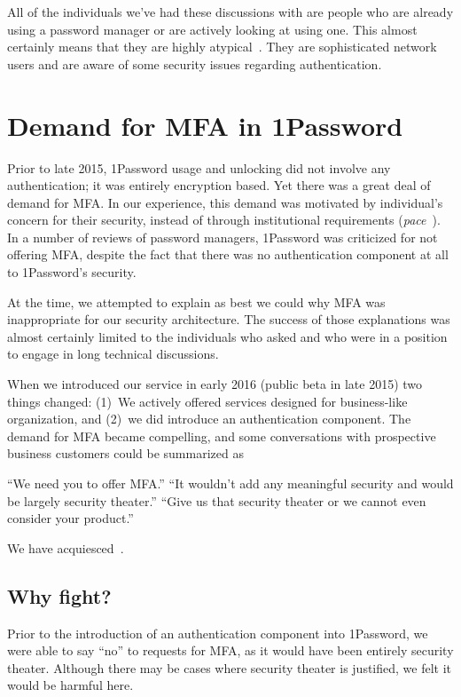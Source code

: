 \documentclass[12pt]{article}
\begin{document}
All of the individuals we've had these discussions with are people who are already using a password manager or are actively looking at using one.
This almost certainly means that they are highly atypical~\autocite{Stobert2014:agony}. 
They are sophisticated network users and are aware of some security issues regarding authentication.

\section{Demand for MFA in 1Password}\label{sec:demand}

Prior to late 2015, 1Password usage and unlocking did not involve any
authentication; it was entirely encryption based.
Yet there was a great deal of demand for MFA\@.
In our experience, this demand was motivated by individual's concern for their security,
instead of through institutional requirements (\textit{pace}~\autocite{CristofaroDFN13}).
In a number of reviews of password managers, 1Password was criticized for not offering MFA, despite the fact that there was no authentication component at all to 1Password's security.

At the time, we attempted to explain as best we could why MFA was inappropriate for our security architecture. The success of those explanations was almost certainly limited to the individuals who asked and who were in a position to engage in long technical discussions.

When we introduced our service in early 2016 (public beta in late 2015) two things changed:
(1)~We actively offered services designed for business-like organization, and (2)~we did introduce an authentication component.
The demand for MFA became compelling,
and some conversations with prospective business customers could be summarized as 

“We need you to offer MFA\@.”\newline
“It wouldn't add any meaningful security and would be largely security theater.”\newline
“Give us that security theater or we cannot even consider your product.”

We have acquiesced~\autocite{Fillion18:mfa}.

\subsection{Why fight?}

Prior to the introduction of an authentication component into 1Password, we were able to say ``no'' to requests for MFA, as it would have been entirely security theater.
Although there may be cases where security theater is justified, we felt it would be harmful here.
\end{document}
